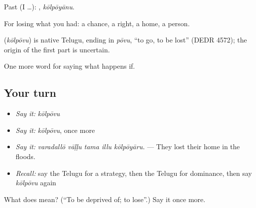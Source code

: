 Past (I …): , \emph{kōlpōyānu}.

For losing what you had: a chance, a right, a home, a person.

\begin{cousinweb}
\textbf{} (\emph{kōlpōvu}) is native Telugu, ending in \emph{pōvu}, \textquotedblleft{}to go, to be lost\textquotedblright{} (DEDR 4572); the origin of the first part is uncertain.
\end{cousinweb}

\begin{grammarlens}[title={What you've built}]
One more word for saying what happens if.
\end{grammarlens}

\subsection*{Your turn}
\begin{itemize}
\raggedright
  \item \emph{Say it:} \emph{kōlpōvu}
  \item \emph{Say it:} \emph{kōlpōvu}, once more
  \item \emph{Say it:} \emph{varadallō vāḷḷu tama illu kōlpōyāru.} — They lost their home in the floods.
  \item \emph{Recall:} say the Telugu for a strategy, then the Telugu for dominance, then say \emph{kōlpōvu} again
\end{itemize}

\begin{tcolorbox}[breakable,colback=teal!4,colframe=teal!35!black,title={Before you move on}]
What does  mean? (\textquotedblleft{}To be deprived of; to lose\textquotedblright{}.) Say it once more.
\end{tcolorbox}
